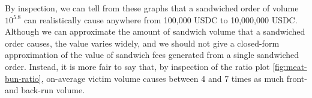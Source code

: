         By inspection, we can tell from these graphs that a sandwiched order of volume $10^{5.8}$ can realistically cause anywhere from 100,000 USDC to 10,000,000 USDC. Although we can approximate the amount of sandwich volume that a sandwiched order causes, the value varies widely, and we should not give a closed-form approximation of the value of sandwich fees generated from a single sandwiched order. Instead, it is more fair to say that, by inspection of the ratio plot \ref{fig:meat-bun-ratio}, on-average  victim volume causes between 4 and 7 times as much front- and back-run volume.















































